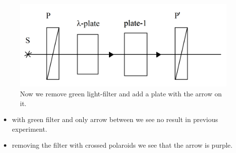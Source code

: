 \begin{minipage}{0.5\textwidth}
    \begin{figure}[h]
    \centering
    \includegraphics[width=1\textwidth]{images/arrow.png}
    \caption{Now we remove green light-filter and add a plate with the arrow on it.}
\end{figure}
\end{minipage}
\hfill
\begin{minipage}{0.45\textwidth}
    \begin{itemize}
    	\item with green filter and only arrow between we see no result in previous experiment.
    	\item removing the filter with crossed polaroids we see that the arrow is purple.
    \end{itemize}
\end{minipage}